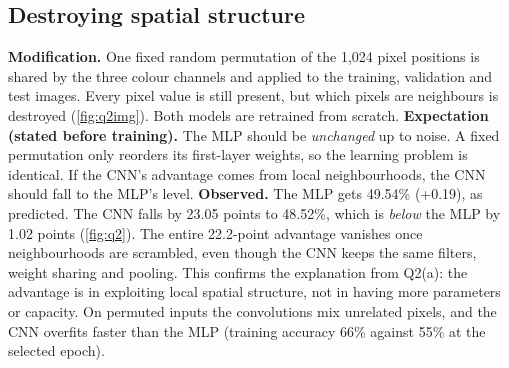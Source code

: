 \documentclass[10pt,twocolumn,letterpaper]{article}
\begin{document}
\subsection{Destroying spatial structure}
\textbf{Modification.} One fixed random permutation of the 1,024 pixel positions is shared by the three colour channels and applied to the training, validation and test images.
Every pixel value is still present, but which pixels are neighbours is destroyed (\cref{fig:q2img}).
Both models are retrained from scratch.
\textbf{Expectation (stated before training).} The MLP should be \emph{unchanged} up to noise.
A fixed permutation only reorders its first-layer weights, so the learning problem is identical.
If the CNN's advantage comes from local neighbourhoods, the CNN should fall to the MLP's level.
\textbf{Observed.} The MLP gets 49.54\% (+0.19), as predicted.
The CNN falls by 23.05 points to 48.52\%, which is \emph{below} the MLP by 1.02 points (\cref{fig:q2}).
The entire 22.2-point advantage vanishes once neighbourhoods are scrambled, even though the CNN keeps the same filters, weight sharing and pooling.
This confirms the explanation from Q2(a): the advantage is in exploiting local spatial structure, not in having more parameters or capacity.
On permuted inputs the convolutions mix unrelated pixels, and the CNN overfits faster than the MLP (training accuracy 66\% against 55\% at the selected epoch).
\end{document}
